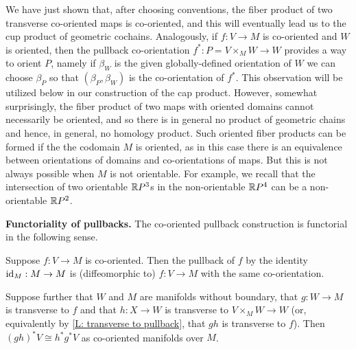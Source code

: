 \begin{remark}\label{R: what products exist}
	We have just shown that, after choosing conventions, the fiber product of two transverse co-oriented maps is co-oriented, and this will eventually lead us to the cup product of geometric cochains.
	Analogously, if $f:V\to M$ is co-oriented and $W$ is oriented, then the pullback co-orientation $f^*:P=V\times_MW\to W$ provides a way to orient $P$, namely if $\beta_W$ is the given globally-defined orientation of $W$ we can choose $\beta_P$ so that $(\beta_P,\beta_W)$ is the co-orientation of $f^*$.
	This observation will be utilized below in our construction of the cap product.
	However, somewhat surprisingly, the fiber product of two maps with oriented domains cannot necessarily be oriented, and so there is in general no product of geometric chains and hence, in general, no homology product.
	Such oriented fiber products can be formed if the the codomain $M$ is oriented, as in this case there is an equivalence between orientations of domains and co-orientations of maps.
	But this is not always possible when $M$ is not orientable.
	For example, we recall that the intersection of two orientable $\mathbb{R} P^3$s in the non-orientable $\mathbb{R} P^4$ can be a non-orientable $\mathbb{R} P^2$.
\end{remark}

\textbf{Functoriality of pullbacks.} The co-oriented pullback construction is functorial in the following sense.

\begin{proposition}\label{P: pullback functoriality}
	Suppose $f:V\to M$ is co-oriented.
	Then the pullback of $f$ by the identity $\mathrm{id}_M:M\to M$ is (diffeomorphic to) $f:V\to M$ with the same co-orientation.

	Suppose further that $W$ and $M$ are manifolds without boundary, that $g:W\to M$ is transverse to $f$ and that $h:X\to W$ is transverse to $V\times_M W\to W$ (or, equivalently by \cref{L: transverse to pullback}, that $gh$ is transverse to $f$).
	Then $(gh)^*V\cong h^*g^*V$ as co-oriented manifolds over $M$.
\end{proposition}

